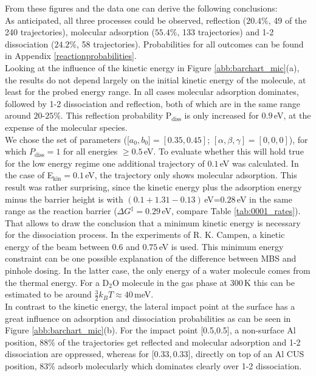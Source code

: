 \documentclass[11pt,DIV=13,BCOR=5mm,a4paper,headinclude]{scrbook}
\begin{document}
From these figures and the data one can derive the following conclusions:
\\
As anticipated, all three processes could be observed, reflection ($20.4\%$, 49 of the 240 trajectories), molecular adsorption ($55.4\%$, 133 trajectories) and 1-2 dissociation ($24.2\%$, 58 trajectories).
Probabilities for all outcomes can be found in Appendix \ref{reactionprobabilities}.
\\
Looking at the influence of the kinetic energy in Figure \ref{abb:barchart_mic}(a), the results do not depend largely on the initial kinetic energy of the molecule, at least for the probed energy range.
In all cases molecular adsorption dominates, followed by 1-2 dissociation and reflection, both of which are in the same range around $20$-$25\%$.
This reflection probability P$_\textrm{diss}$ is only increased for $0.9\,$eV, at the expense of the molecular species.\\
We chose the set of parameters ([$a_0,b_0]=[0.35,0.45]$; $[\alpha,\beta,\gamma]=[0,0,0]$), for which $P_\textrm{diss}=1$ for all energies $\geq 0.5\,$eV.
To evaluate whether this will hold true for the low energy regime one additional trajectory of $0.1\,$eV was calculated.
In the case of E$_\textrm{kin}=0.1\,$eV, the trajectory only shows molecular adsorption.
This result was rather surprising, since the kinetic energy plus the adsorption energy minus the barrier height is with $(0.1+1.31-0.13)\,$eV=$0.28\,$eV in the same range as the reaction barrier ($\Delta G^\ddagger=0.29\,$eV, compare Table \ref{tab:0001_rates}).
That allows to draw the conclusion that a minimum kinetic energy is necessary for the dissociation process.
In the experiments of R. K. Campen, a kinetic energy of the beam between $0.6$ and $0.75\,$eV is used.
This minimum energy constraint can be one possible explanation of the difference between MBS and pinhole dosing.
In the latter case, the only energy of a water molecule comes from the thermal energy.
For a D$_2$O molecule in the gas phase at $300\,$K this can be estimated to be around $\frac{3}{2}k_BT\approx40\,$meV.
\\
In contrast to the kinetic energy, the lateral impact point at the surface has a great influence on adsorption and dissociation probabilities as can be seen in Figure \ref{abb:barchart_mic}(b).
For the impact point [0.5,0.5], a non-surface Al position, $88\%$ of the trajectories get reflected and molecular adsorption and 1-2 dissociation are oppressed, whereas for [$0.33,0.33$], directly on top of an Al CUS position, $83\%$ adsorb molecularly which dominates clearly over 1-2 dissociation.
\end{document}
